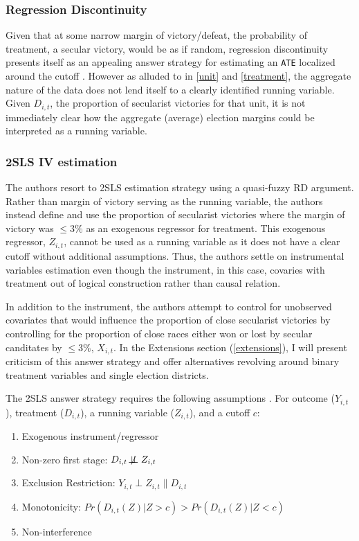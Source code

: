 \documentclass{scrartcl}
\begin{document}
\subsubsection{Regression Discontinuity}
Given that at some narrow margin of victory/defeat, the probability of treatment, a secular victory, would be as if random, regression discontinuity presents itself as an appealing answer strategy for estimating an \texttt{ATE} localized around the cutoff \cite{Cattaneo_2019}. 
However as alluded to in \ref{unit} and \ref{treatment}, the aggregate nature of the data does not lend itself to a clearly identified running variable.
Given $D_{i,t}$, the proportion of secularist victories for that unit, it is not immediately clear how the aggregate (average) election margins could be interpreted as a running variable. 

\subsubsection{2SLS IV estimation} \label{iv}

The authors resort to 2SLS estimation strategy using a quasi-fuzzy RD argument.
Rather than margin of victory serving as the running variable, the authors instead define and use the proportion of secularist victories where the margin of victory was $ \leq 3\%$ as an exogenous regressor for treatment.
This exogenous regressor, $Z_{i,t}$, cannot be used as a running variable as it does not have a clear cutoff without additional assumptions.
Thus, the authors settle on instrumental variables estimation even though the instrument, in this case, covaries with treatment out of logical construction rather than causal relation.

In addition to the instrument, the authors attempt to control for unobserved covariates that would influence the proportion of close secularist victories by controlling for the proportion of close races either won or lost by secular canditates by $\leq 3\%$, $X_{i,t}$.
In the Extensions section (\ref{extensions}), I will present criticism of this answer strategy and offer alternatives revolving around binary treatment variables and single election districts.

The 2SLS answer strategy requires the following assumptions \cite{morgan_2015, Imbens_2008, Cattaneo_2019}.
For outcome ($Y_{i,t}$), treatment ($D_{i,t}$), a running variable ($Z_{i,t}$), and a cutoff $c$:
\begin{enumerate}
\item{Exogenous instrument/regressor}
\item{Non-zero first stage: $D_{i,t} \not\!\perp\!\!\!\perp Z_{i,t}$}
\item{Exclusion Restriction: $Y_{i,t} \perp Z_{i,t} \| D_{i,t}$}
\item{Monotonicity}: $Pr(D_{i,t}(Z) | Z > c) > Pr(D_{i,t}(Z) | Z < c)$
\item{Non-interference}
\end{enumerate}
\end{document}
